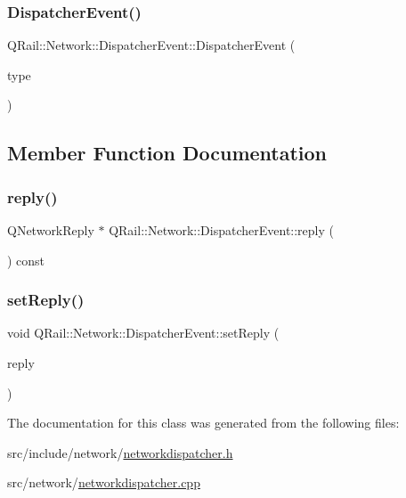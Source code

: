 \subsubsection{\texorpdfstring{DispatcherEvent()}{DispatcherEvent()}}
{\footnotesize\ttfamily Q\+Rail\+::\+Network\+::\+Dispatcher\+Event\+::\+Dispatcher\+Event (\begin{DoxyParamCaption}\item[{const Q\+Event\+::\+Type \&}]{type }\end{DoxyParamCaption})\hspace{0.3cm}{\ttfamily [inline]}}



\subsection{Member Function Documentation}
\mbox{\label{classQRail_1_1Network_1_1DispatcherEvent_a94a75385c15aca824628940d13124f2f}} 
\subsubsection{\texorpdfstring{reply()}{reply()}}
{\footnotesize\ttfamily Q\+Network\+Reply $\ast$ Q\+Rail\+::\+Network\+::\+Dispatcher\+Event\+::reply (\begin{DoxyParamCaption}{ }\end{DoxyParamCaption}) const}

\mbox{\label{classQRail_1_1Network_1_1DispatcherEvent_a68639e6a5ee34d8c8e6bb418d8c006e5}} 
\subsubsection{\texorpdfstring{setReply()}{setReply()}}
{\footnotesize\ttfamily void Q\+Rail\+::\+Network\+::\+Dispatcher\+Event\+::set\+Reply (\begin{DoxyParamCaption}\item[{Q\+Network\+Reply $\ast$}]{reply }\end{DoxyParamCaption})}



The documentation for this class was generated from the following files\+:\begin{DoxyCompactItemize}
\item 
src/include/network/\mbox{\hyperlink{networkdispatcher_8h}{networkdispatcher.\+h}}\item 
src/network/\mbox{\hyperlink{networkdispatcher_8cpp}{networkdispatcher.\+cpp}}\end{DoxyCompactItemize}
